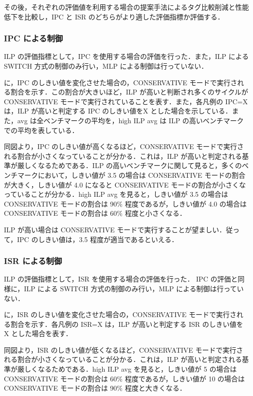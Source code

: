 その後，それぞれの評価値を利用する場合の提案手法によるタグ比較削減と性能低下を比較し，IPC と ISR のどちらがより適した評価指標か評価する．

\subsubsection{IPC による制御}
ILP の評価指標として，IPC を使用する場合の評価を行った．また，ILP による SWITCH 方式の制御のみ行い，MLP による制御は行っていない．

に，IPC のしきい値を変化させた場合の，CONSERVATIVE モードで実行される割合を示す．この割合が大きいほど，ILP が高いと判断され多くのサイクルが CONSERVATIVE モードで実行されていることを表す．また，各凡例の IPC=X は，ILP が高いと判定する IPC のしきい値をX とした場合を示している．また，avg は全ベンチマークの平均を，high ILP avg は ILP の高いベンチマークでの平均を表している． 

同図より，IPC のしきい値が高くなるほど，CONSERVATIVE モードで実行される割合が小さくなっていることが分かる．これは，ILP が高いと判定される基準が厳しくなるためである．ILP の高いベンチマークに関して見ると，多くのベンチマークにおいて，しきい値が 3.5 の場合は CONSERVATIVE モードの割合が大きく，しきい値が 4.0 になると CONSERVATIVE モードの割合が小さくなっていることが分かる．high ILP avg を見ると，しきい値が 3.5 の場合は CONSERVATIVE モードの割合は 90\% 程度であるが，しきい値が 4.0 の場合は CONSERVATIVE モードの割合は 60\% 程度と小さくなる．

ILP が高い場合は CONSERVATIVE モードで実行することが望ましい．従って，IPC のしきい値は，3.5 程度が適当であるといえる．

\subsubsection{ISR による制御}
ILP の評価指標として，ISR を使用する場合の評価を行った． IPC の評価と同様に，ILP による SWITCH 方式の制御のみ行い，MLP による制御は行っていない．

に，ISR のしきい値を変化させた場合の，CONSERVATIVE モードで実行される割合を示す．各凡例の ISR=X は，ILP が高いと判定する ISR のしきい値を X とした場合を表す．

同図より，ISR のしきい値が低くなるほど，CONSERVATIVE モードで実行される割合が小さくなっていることが分かる．これは，ILP が高いと判定される基準が厳しくなるためである．high ILP avg を見ると，しきい値が 5 の場合は CONSERVATIVE モードの割合は 60\% 程度であるが，しきい値が 10 の場合は CONSERVATIVE モードの割合は 90\% 程度と大きくなる．

